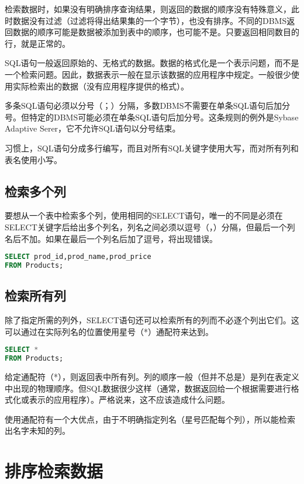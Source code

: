 检索数据时，如果没有明确排序查询结果，则返回的数据的顺序没有特殊意义，此时数据没有过滤（过滤将得出结果集的一个字节），也没有排序。不同的DBMS返回数据的顺序可能是数据被添加到表中的顺序，也可能不是。只要返回相同数目的行，就是正常的。

SQL语句一般返回原始的、无格式的数据。数据的格式化是一个表示问题，而不是一个检索问题。因此，数据表示一般在显示该数据的应用程序中规定。一般很少使用实际检索出的数据（没有应用程序提供的格式）。

多条SQL语句必须以分号（；）分隔，多数DBMS不需要在单条SQL语句后加分号。但特定的DBMS可能必须在单条SQL语句后加分号。这条规则的例外是Sybase Adaptive Serer，它不允许SQL语句以分号结束。

习惯上，SQL语句分成多行编写，而且对所有SQL关键字使用大写，而对所有列和表名使用小写。
\subsection{检索多个列}

要想从一个表中检索多个列，使用相同的SELECT语句，唯一的不同是必须在SELECT关键字后给出多个列名，列名之间必须以逗号（，）分隔，但最后一个列名后不加。如果在最后一个列名后加了逗号，将出现错误。

\begin{lstlisting}[language=SQL]
SELECT prod_id,prod_name,prod_price
FROM Products;
\end{lstlisting}
\subsection{检索所有列}


除了指定所需的列外，SELECT语句还可以检索所有的列而不必逐个列出它们。这可以通过在实际列名的位置使用星号（*）通配符来达到。

\begin{lstlisting}[language=SQL]
SELECT *
FROM Products;
\end{lstlisting}

给定通配符（*），则返回表中所有列。列的顺序一般（但并不总是）是列在表定义中出现的物理顺序。但SQL数据很少这样（通常，数据返回给一个根据需要进行格式化或表示的应用程序）。严格说来，这不应该造成什么问题。

使用通配符有一个大优点，由于不明确指定列名（星号匹配每个列），所以能检索出名字未知的列。
\section{排序检索数据}


